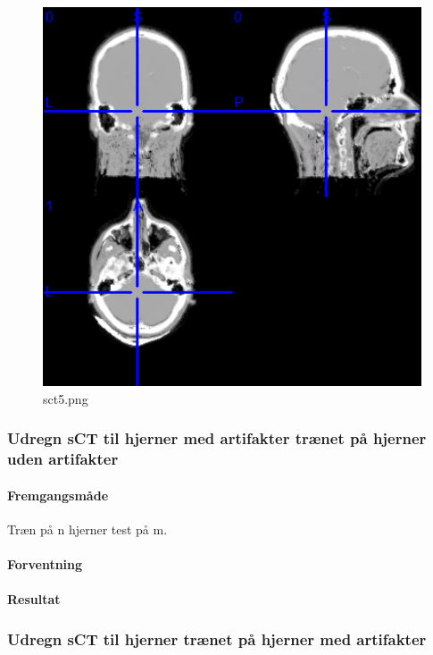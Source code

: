\begin{figure}
\includegraphics[width=\linewidth]{sct5.png}
\caption{sct5.png}
\end{figure}

\subsubsection{Udregn sCT til hjerner med artifakter trænet på hjerner uden artifakter}
\paragraph{Fremgangsmåde}
Træn på n hjerner test på m.

\paragraph{Forventning}

\paragraph{Resultat}

\subsubsection{Udregn sCT til hjerner trænet på hjerner med artifakter}
